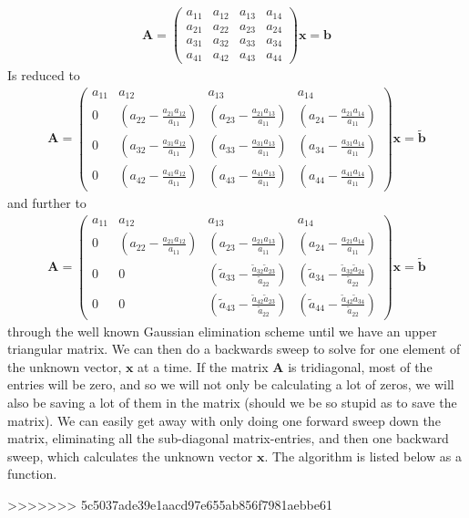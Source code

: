 \begin{align}
  \mathbf{A} = 
 \left( \begin{array}{rrrr}
 a_{11} & a_{12} & a_{13} & a_{14} \\
 a_{21} & a_{22} & a_{23} & a_{24} \\
 a_{31} & a_{32} & a_{33} & a_{34} \\
 a_{41} & a_{42} & a_{43} & a_{44}
 \end{array} \right)\mathbf{x} = \mathbf{b}
\end{align}
Is reduced to
\begin{align}
  \mathbf{A} = 
 \left( \begin{array}{rrrr}
 a_{11} & a_{12} & a_{13} & a_{14} \\
 0 & (a_{22}-\frac{a_{21}a_{12}}{a_{11}}) & (a_{23}-\frac{a_{21}a_{13}}{a_{11}}) & (a_{24}-\frac{a_{21}a_{14}}{a_{11}}) \\
 0 & (a_{32}-\frac{a_{31}a_{12}}{a_{11}}) & (a_{33}-\frac{a_{31}a_{13}}{a_{11}}) & (a_{34}-\frac{a_{31}a_{14}}{a_{11}}) \\
 0 & (a_{42}-\frac{a_{41}a_{12}}{a_{11}}) & (a_{43}-\frac{a_{41}a_{13}}{a_{11}}) & (a_{44}-\frac{a_{41}a_{14}}{a_{11}})
 \end{array} \right)\mathbf{x} = \tilde{\mathbf{b}}
\end{align}
and further to
\begin{align}
  \mathbf{A} = 
 \left( \begin{array}{rrrr}
 a_{11} & a_{12} & a_{13} & a_{14} \\
 0 & (a_{22}-\frac{a_{21}a_{12}}{a_{11}}) & (a_{23}-\frac{a_{21}a_{13}}{a_{11}}) & (a_{24}-\frac{a_{21}a_{14}}{a_{11}}) \\
 0 & 0 & (\tilde{a}_{33}-\frac{\tilde{a}_{32}\tilde{a}_{23}}{\tilde{a}_{22}}) & (\tilde{a}_{34}-\frac{\tilde{a}_{32}\tilde{a}_{24}}{\tilde{a}_{22}}) \\
 0 & 0 & (\tilde{a}_{43}-\frac{\tilde{a}_{42}\tilde{a}_{23}}{\tilde{a}_{22}}) & (\tilde{a}_{44}-\frac{\tilde{a}_{42}\tilde{a}_{34}}{\tilde{a}_{22}})
 \end{array} \right)\mathbf{x} = \tilde{\mathbf{b}}
\end{align}
through the well known Gaussian elimination scheme until we have an upper triangular matrix. We can then do a backwards sweep to solve for one element of the unknown vector, $\mathbf{x}$ at a time. If the matrix $\mathbf{A}$ is tridiagonal, most of the entries will be zero, and so we will not only be calculating a lot of zeros, we will also be saving a lot of them in the matrix (should we be so stupid as to save the matrix). We can easily get away with only doing one forward sweep down the matrix, eliminating all the sub-diagonal matrix-entries, and then one backward sweep, which calculates the unknown vector $\mathbf{x}$. The algorithm is listed below as a function.


>>>>>>> 5c5037ade39e1aacd97e655ab856f7981aebbe61
